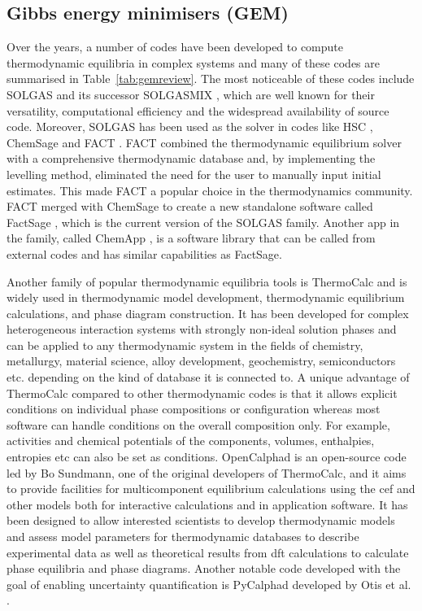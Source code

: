 \subsection{Gibbs energy minimisers (GEM)}
	Over the years, a number of codes have been developed to compute thermodynamic equilibria in complex systems and many of these codes are summarised in Table~\ref{tab:gemreview}. The most noticeable of these codes include SOLGAS \cite{Eriksson71} and its successor SOLGASMIX \cite{Eriksson:1975aa}, which are well known for their versatility, computational efficiency and the widespread availability of source code. Moreover,  SOLGAS has been used as the solver in codes like HSC \cite{HSCSoftware:aa}, ChemSage \cite{Eriksson90} and FACT \cite{Thompson83}. FACT combined the thermodynamic equilibrium solver with a comprehensive thermodynamic database and, by implementing the levelling method, eliminated the need for the user to manually input initial estimates. This made FACT a popular choice in the thermodynamics community. FACT merged with ChemSage to create a new standalone software called FactSage \cite{Bale02}, which is the current version of the SOLGAS family. Another app in the family, called ChemApp \cite{Eriksson:2008aa,Petersen:2007aa}, is a software library that can be called from external codes and has similar capabilities as FactSage.

	Another family of popular thermodynamic equilibria tools is ThermoCalc \cite{ANDERSSON2002273} and is widely used in thermodynamic model development, thermodynamic equilibrium calculations, and  phase diagram construction. It has been developed for complex heterogeneous interaction systems with strongly non-ideal solution phases and can be applied to any thermodynamic system in the fields of chemistry, metallurgy, material science, alloy development, geochemistry, semiconductors etc. depending on the kind of database it is connected to. A unique advantage of ThermoCalc compared to other thermodynamic codes is that it allows explicit conditions on individual phase compositions or configuration whereas most software can handle conditions on the overall composition only. For example, activities and chemical potentials of the components, volumes, enthalpies, entropies etc can also be set as conditions.  OpenCalphad \cite{Sundman:2015aa} is an open-source code led by Bo Sundmann, one of the original developers of ThermoCalc, and it aims to provide facilities for multicomponent equilibrium calculations using the \gls{cef} and other models both for interactive calculations and in application software. It has been designed to allow interested scientists to develop thermodynamic models and assess model parameters for thermodynamic databases to describe experimental data as well as theoretical results from \gls{dft} calculations to calculate phase equilibria and phase diagrams. Another notable code developed with the goal of enabling uncertainty quantification is PyCalphad developed by Otis et al. \cite{Otis:2017aa}.


